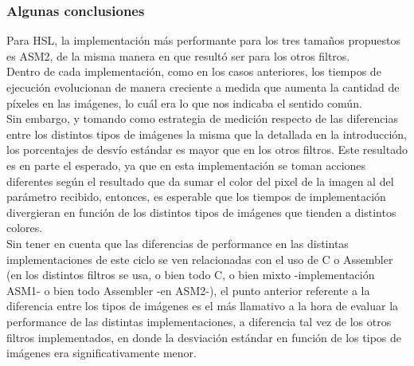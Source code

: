 \subsubsection{Algunas conclusiones}
Para HSL, la implementación más performante para los tres tamaños propuestos es ASM2, de la misma manera en que resultó ser para los otros filtros.\\
Dentro de cada implementación, como en los casos anteriores, los tiempos de ejecución evolucionan de manera creciente a medida que aumenta la cantidad de píxeles en las imágenes, lo cuál era lo que nos indicaba el sentido común.\\

Sin embargo, y tomando como estrategia de medición respecto de las diferencias entre los distintos tipos de imágenes la misma que la detallada en la introducción, los porcentajes de desvío estándar es mayor que en los otros filtros. Este resultado es en parte el esperado, ya que en esta implementación se toman acciones diferentes según el resultado que da sumar el color del pixel de la imagen al del parámetro recibido, entonces, es esperable que los tiempos de implementación divergieran en función de los distintos tipos de imágenes que tienden a distintos colores.\\

Sin tener en cuenta que las diferencias de performance en las distintas implementaciones de este ciclo se ven relacionadas con el uso de C o Assembler (en los distintos filtros se usa, o bien todo C, o bien mixto -implementación ASM1- o bien todo Assembler -en ASM2-), el punto anterior referente a la diferencia entre los tipos de imágenes es el más llamativo a la hora de evaluar la performance de las distintas implementaciones, a diferencia tal vez de los otros filtros implementados, en donde la desviación estándar en función de los tipos de imágenes era significativamente menor. 